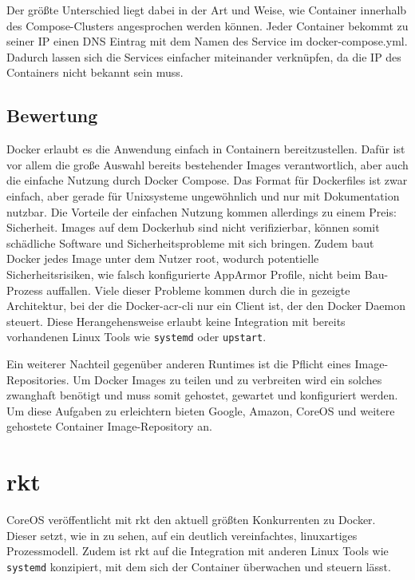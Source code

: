 Der größte Unterschied liegt dabei in der Art und Weise, wie Container innerhalb des Compose-Clusters angesprochen werden können. Jeder Container bekommt zu seiner IP einen DNS Eintrag mit dem Namen des Service im docker-compose.yml. Dadurch lassen sich die Services einfacher miteinander verknüpfen, da die IP des Containers nicht bekannt sein muss.

\subsection{Bewertung}
\label{sec:compDockerBewertung}
Docker erlaubt es die Anwendung einfach in Containern bereitzustellen. Dafür ist vor allem die große Auswahl bereits bestehender Images verantwortlich, aber auch die einfache Nutzung durch Docker Compose. Das Format für Dockerfiles ist zwar einfach, aber gerade für Unixsysteme ungewöhnlich und nur mit Dokumentation nutzbar. Die Vorteile der einfachen Nutzung kommen allerdings zu einem Preis: Sicherheit. Images auf dem Dockerhub sind nicht verifizierbar, können somit schädliche Software und Sicherheitsprobleme mit sich bringen. Zudem baut Docker jedes Image unter dem Nutzer root, wodurch potentielle Sicherheitsrisiken, wie falsch konfigurierte AppArmor Profile, nicht beim Bau-Prozess auffallen. Viele dieser Probleme kommen durch die in  gezeigte Architektur, bei der die Docker-\gls{acr-cli} nur ein Client ist, der den Docker Daemon steuert. Diese Herangehensweise erlaubt keine Integration mit bereits vorhandenen Linux Tools wie \texttt{systemd} oder \texttt{upstart}.

Ein weiterer Nachteil gegenüber anderen Runtimes ist die Pflicht eines Image-Repositories. Um Docker Images zu teilen und zu verbreiten wird ein solches zwanghaft benötigt und muss somit gehostet, gewartet und konfiguriert werden. Um diese Aufgaben zu erleichtern bieten Google, Amazon, CoreOS und weitere gehostete Container Image-Repository an.

\section{rkt}
\label{sec:compRkt}

CoreOS veröffentlicht mit rkt den aktuell größten Konkurrenten zu Docker. Dieser setzt, wie in  zu sehen, auf ein deutlich vereinfachtes, linuxartiges Prozessmodell. Zudem ist rkt auf die Integration mit anderen Linux Tools wie \texttt{systemd} konzipiert, mit dem sich der Container überwachen und steuern lässt.

